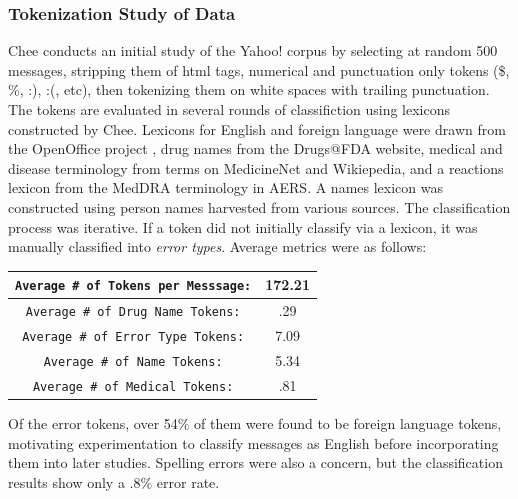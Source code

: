 \documentclass[twoside,11pt]{article}
\begin{document}
\subsubsection{Tokenization Study of Data}
Chee conducts an initial study of the Yahoo! corpus by selecting at random 500 messages, stripping them of html tags, numerical and punctuation only tokens (\$, \%, :), :(, etc), then tokenizing them on white spaces with trailing punctuation. The tokens are evaluated in several rounds of classifiction using lexicons constructed by Chee. Lexicons for English and foreign language were drawn from the OpenOffice project \citep{OpenOffice}, drug names from the Drugs@FDA website, medical and disease terminology from terms on MedicineNet and Wikiepedia, and a reactions lexicon from the MedDRA terminology in AERS. A names lexicon was constructed using person names harvested from various sources. The classification process was iterative. If a token did not initially classify via a lexicon, it was manually classified into \textit{error types}. Average metrics were as follows:
\begin{center}
  \begin{tabular}{||c|c||}
    \hline
    \verb|Average # of Tokens per Messsage:| & 172.21\\
    \hline
    \verb|Average # of Drug Name Tokens:| & .29\\
    \hline
    \verb|Average # of Error Type Tokens:| & 7.09\\
    \hline
    \verb|Average # of Name Tokens:| & 5.34\\
    \hline
    \verb|Average # of Medical Tokens:| & .81\\
    \hline
  \end{tabular}
\end{center}
Of the error tokens, over 54\% of them were found to be foreign language tokens, motivating experimentation to classify messages as English before incorporating them into later studies. Spelling errors were also a concern, but the classification results show only a $.8\%$ error rate. %
\end{document}
